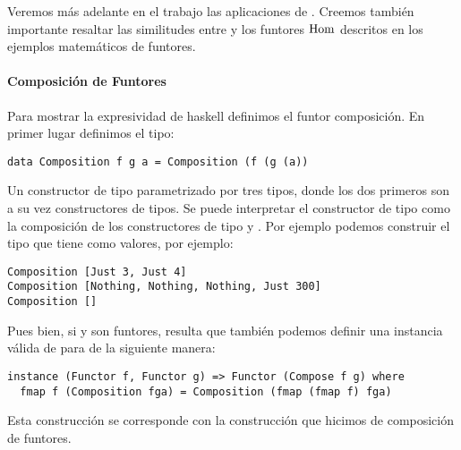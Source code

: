 Veremos más adelante en el trabajo las aplicaciones
de . Creemos también importante resaltar las similitudes
entre  y los funtores $\operatorname{Hom}$ descritos en los ejemplos
matemáticos de funtores.

\paragraph{Composición de Funtores}
Para mostrar la expresividad de haskell definimos el funtor composición.
En primer lugar definimos el tipo:
\begin{verbatim}
data Composition f g a = Composition (f (g (a))
\end{verbatim}
Un constructor de tipo parametrizado por tres tipos, donde los dos
primeros son a su vez constructores de tipos. Se puede interpretar
el constructor de tipo  como la composición de
los constructores de tipo  y . Por ejemplo podemos
construir el tipo  que tiene como
valores, por ejemplo:
\begin{verbatim}
Composition [Just 3, Just 4]
Composition [Nothing, Nothing, Nothing, Just 300]
Composition []
\end{verbatim}
Pues bien, si  y  son funtores, resulta que también
podemos definir una instancia válida de  para
 de la siguiente manera:
\begin{verbatim}
instance (Functor f, Functor g) => Functor (Compose f g) where
  fmap f (Composition fga) = Composition (fmap (fmap f) fga)
\end{verbatim}
Esta construcción se corresponde con la construcción que
hicimos de composición de funtores.
